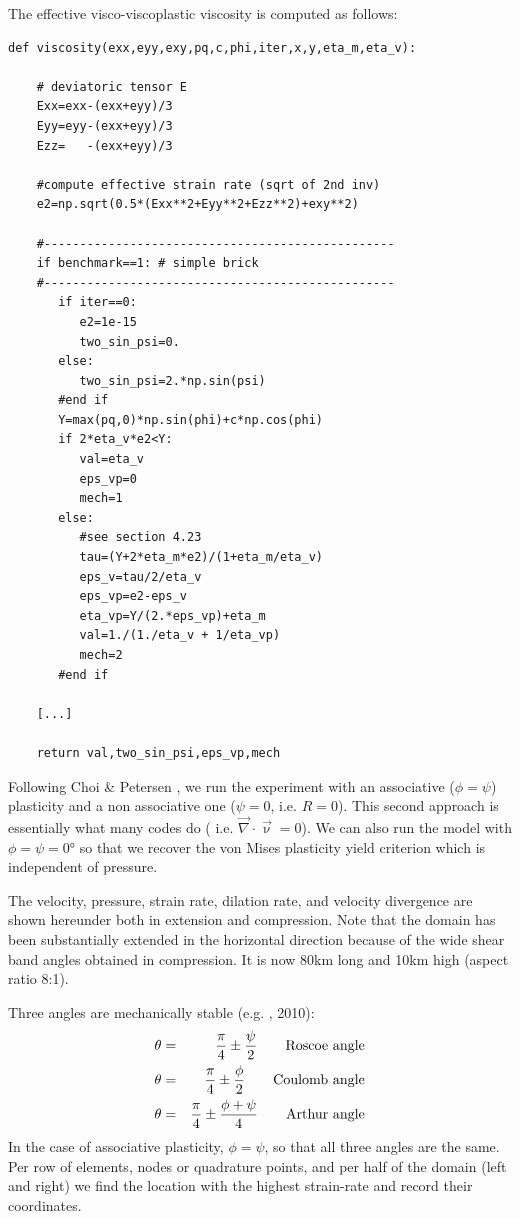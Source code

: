The effective visco-viscoplastic viscosity is computed as follows:
\begin{lstlisting}
def viscosity(exx,eyy,exy,pq,c,phi,iter,x,y,eta_m,eta_v):

    # deviatoric tensor E
    Exx=exx-(exx+eyy)/3
    Eyy=eyy-(exx+eyy)/3
    Ezz=   -(exx+eyy)/3

    #compute effective strain rate (sqrt of 2nd inv)
    e2=np.sqrt(0.5*(Exx**2+Eyy**2+Ezz**2)+exy**2)

    #-------------------------------------------------
    if benchmark==1: # simple brick
    #-------------------------------------------------
       if iter==0:
          e2=1e-15
          two_sin_psi=0.
       else:
          two_sin_psi=2.*np.sin(psi)
       #end if
       Y=max(pq,0)*np.sin(phi)+c*np.cos(phi)
       if 2*eta_v*e2<Y:
          val=eta_v
          eps_vp=0
          mech=1
       else:
          #see section 4.23
          tau=(Y+2*eta_m*e2)/(1+eta_m/eta_v)
          eps_v=tau/2/eta_v
          eps_vp=e2-eps_v
          eta_vp=Y/(2.*eps_vp)+eta_m
          val=1./(1./eta_v + 1/eta_vp)
          mech=2
       #end if

    [...]

    return val,two_sin_psi,eps_vp,mech

\end{lstlisting}




Following Choi \& Petersen \cite{chpe15}, we run the experiment with an associative ($\phi=\psi$) plasticity
and a non associative one ($\psi=0$, i.e. $R=0$). This second approach is essentially what many codes do (
i.e. $\vec\nabla\cdot\vec\upnu = 0$). We can also run the model with $\phi=\psi=0\si{\degree}$ so that 
we recover the von Mises plasticity yield criterion which is independent of pressure.  

The velocity, pressure, strain rate, dilation rate, and velocity divergence are shown hereunder both in 
extension and compression. Note that the domain has been substantially extended in the horizontal 
direction because of the wide shear band angles obtained in compression. It is now 80\si{\km} long 
and 10\si{\km} high (aspect ratio 8:1). 

Three angles are mechanically stable (e.g. \textcite{kaus10}, 2010):
\begin{eqnarray}
\theta&=&\frac{\pi}{4}\pm \frac{\psi}{2} \qquad \text{Roscoe angle} \nonumber\\
\theta&=&\frac{\pi}{4}\pm \frac{\phi}{2} \qquad \text{Coulomb angle}\nonumber\\
\theta&=&\frac{\pi}{4}\pm \frac{\phi+\psi}{4} \qquad \text{Arthur angle}\nonumber
\end{eqnarray}
In the case of associative plasticity, $\phi=\psi$, so that all three angles are the same. 
Per row of elements, nodes or quadrature points, and per half of the domain (left and right) we find the location
with the highest strain-rate and record their coordinates.





